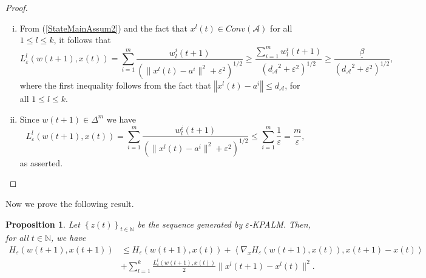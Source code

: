 \documentclass[12pt]{article}
\numberwithin{equation}{section}
\newtheorem{proposition}{Proposition}[section]
\newcommand{\norm}[1]{\left\Vert {#1} \right\Vert} %
\begin{document}
\begin{proof}
\begin{enumerate}[(i)]
	\item From (\ref{StateMainAssum2}) and the fact that $x^l(t) \in Conv(\mathcal{A})$ for all $1 \leq l \leq k$, it follows that
	\begin{equation*}
		L^l_{\varepsilon}(w(t+1),x(t)) = \sum\limits_{i=1}^{m} \frac{w^i_l(t+1)}{\left( \|x^l(t) - a^i\|^2 + {\varepsilon}^2 \right)^{1/2}} \geq \frac{\sum_{i=1}^{m}w^i_l(t+1)}{\left( {d_{\mathcal{A}}}^2 + {\varepsilon}^2 \right)^{1/2}} \geq \frac{\underline{\beta}}{\left( {d_{\mathcal{A}}}^2 + {\varepsilon}^2 \right)^{1/2}} ,
	\end{equation*}
	where the first inequality follows from the fact that $\norm{x^l(t) - a^i} \leq d_{\mathcal{A}}$, for all $1 \leq l \leq k$. 
	\item Since $w(t+1) \in {\Delta}^m$ we have
	\begin{equation*}
		L^l_{\varepsilon}(w(t+1),x(t)) = \sum\limits_{i=1}^{m} \frac{w^i_l(t+1)}{\left( \|x^l(t) - a^i\|^2 + {\varepsilon}^2 \right)^{1/2}} \leq \sum\limits_{i=1}^{m} \frac{1}{\varepsilon} = \frac{m}{\varepsilon} ,
	\end{equation*}
	as asserted.
\end{enumerate}
\end{proof}

Now we prove the following result.

\begin{proposition} \label{State_H_eps_prop}
Let $\left\lbrace z(t) \right\rbrace_{t \in \mathbb{N}}$ be the sequence generated by $\varepsilon$-KPALM. Then, for all $t \in \mathbb{N}$, we have
\begin{align*}
	H_{\varepsilon}(w(t+1),x(t+1)) 
	&\leq H_{\varepsilon}(w(t+1),x(t)) + \left\langle \nabla_x H_{\varepsilon}(w(t+1),x(t)), x(t+1)-x(t) \right\rangle \\
	&+ \sum\limits_{l=1}^{k} \frac{L^l_{\varepsilon}(w(t+1),x(t))}{2} \|x^l(t+1)-x^l(t)\|^2 .
\end{align*}
\end{proposition}
\end{document}
